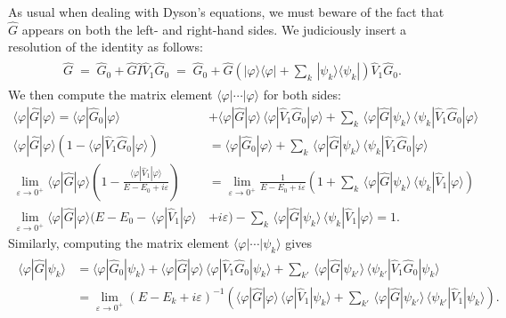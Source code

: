 \documentclass[prx,12pt]{revtex4-2}
\begin{document}
As usual when dealing with Dyson's equations, we must beware of the
fact that $\hat{G}$ appears on both the left- and right-hand sides.
We judiciously insert a resolution of the identity as follows:
\begin{align}
  \begin{aligned}
    \hat{G} \;=\; \hat{G}_0 + \hat{G} \hat{I} \hat{V}_1 \hat{G}_0
    \;=\; \hat{G}_0 + \hat{G} \left(|\varphi\rangle\langle\varphi|
    + \sum_k\, |\psi_k\rangle\langle\psi_k|\right) \hat{V}_1 \hat{G}_0.
  \end{aligned}
\end{align}
We then compute the matrix element
$\langle\varphi|\cdots|\varphi\rangle$ for both sides:
\begin{align}
    \langle\varphi|\hat{G}|\varphi\rangle = \langle\varphi|\hat{G}_0|\varphi\rangle &+ \langle\varphi|\hat{G}|\varphi\rangle \, \langle\varphi|\hat{V}_1 \hat{G}_0|\varphi\rangle + \sum_k\, \langle\varphi|\hat{G}|\psi_k\rangle \, \langle\psi_k| \hat{V}_1 \hat{G}_0|\varphi\rangle \nonumber\\
    \langle\varphi|\hat{G}|\varphi\rangle \left(1 - \langle\varphi|\hat{V}_1 \hat{G}_0|\varphi\rangle\right) &= \langle\varphi|\hat{G}_0|\varphi\rangle + \sum_k \, \langle\varphi|\hat{G}|\psi_k\rangle \, \langle\psi_k| \hat{V}_1 \hat{G}_0|\varphi\rangle \nonumber\\
    \lim_{\varepsilon\rightarrow0^+}
    \langle\varphi|\hat{G}|\varphi\rangle \left(1 - \frac{\langle\varphi|\hat{V}_1|\varphi\rangle}{E - E_0 + i\varepsilon}\right) &= \lim_{\varepsilon\rightarrow0^+} \frac{1}{E  - E_0 + i\varepsilon} \left(1+ \sum_k \, \langle\varphi|\hat{G}|\psi_k\rangle \, \langle\psi_k| \hat{V}_1|\varphi\rangle \right) \nonumber\\
    \lim_{\varepsilon\rightarrow0^+} \langle\varphi|\hat{G}|\varphi\rangle \Big(E - E_0 -\, \langle\varphi|\hat{V}_1|\varphi\rangle \, & + i\varepsilon\Big) - \sum_k\, \langle\varphi|\hat{G}|\psi_k\rangle \, \langle\psi_k| \hat{V}_1|\varphi\rangle = 1. \label{psiGphi}
\end{align}
Similarly, computing the matrix element
$\langle\varphi|\cdots|\psi_k\rangle$ gives
\begin{align*}
  \begin{aligned}
\langle\varphi|\hat{G}|\psi_k\rangle &= \langle\varphi|\hat{G}_0|\psi_k\rangle + \langle\varphi|\hat{G}|\varphi\rangle \, \langle\varphi|\hat{V}_1 \hat{G}_0|\psi_k\rangle + \sum_{k'}\, \langle\varphi|\hat{G}|\psi_{k'}\rangle \, \langle\psi_{k'}| \hat{V}_1 \hat{G}_0|\psi_k\rangle \\
&= \lim_{\varepsilon\rightarrow0^+} \left(E-E_k+i\varepsilon\right)^{-1} \left(\langle\varphi|\hat{G}|\varphi\rangle \, \langle\varphi|\hat{V}_1|\psi_k\rangle + \sum_{k'}\, \langle\varphi|\hat{G}|\psi_{k'}\rangle \, \langle\psi_{k'}| \hat{V}_1|\psi_k\rangle\right).\end{aligned}
\end{align*}
\end{document}
